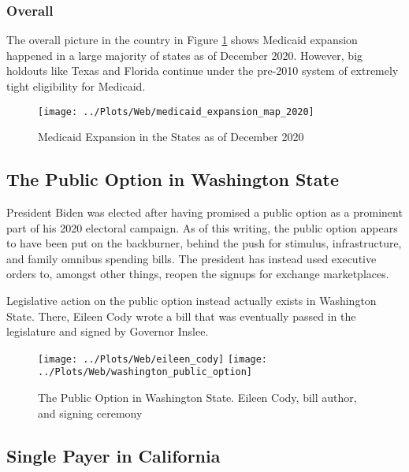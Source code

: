 \documentclass[
  oneside]{book}
\begin{document}
\hypertarget{overall}{%
\subsubsection{Overall}\label{overall}}

The overall picture in the country in Figure \ref{fig:medicaid-expansion-map} shows Medicaid expansion happened in a large majority of states as of December 2020. However, big holdouts like Texas and Florida continue under the pre-2010 system of extremely tight eligibility for Medicaid.

\begin{figure}
\texttt{[image: ../Plots/Web/medicaid\_expansion\_map\_2020]} \caption{Medicaid Expansion in the States as of December 2020}\label{fig:medicaid-expansion-map}
\end{figure}

\hypertarget{the-public-option-in-washington-state}{%
\subsection{The Public Option in Washington State}\label{the-public-option-in-washington-state}}

President Biden was elected after having promised a public option as a prominent part of his 2020 electoral campaign. As of this writing, the public option appears to have been put on the backburner, behind the push for stimulus, infrastructure, and family omnibus spending bills. The president has instead used executive orders to, amongst other things, reopen the signups for exchange marketplaces.

Legislative action on the public option instead actually exists in Washington State. There, Eileen Cody wrote a bill that was eventually passed in the legislature and signed by Governor Inslee.

\begin{figure}
\texttt{[image: ../Plots/Web/eileen\_cody]} \texttt{[image: ../Plots/Web/washington\_public\_option]} \caption{The Public Option in Washington State. Eileen Cody, bill author, and signing ceremony}\label{fig:wastate-publicoption}
\end{figure}

\hypertarget{single-payer-in-california}{%
\subsection{Single Payer in California}\label{single-payer-in-california}}
\end{document}

